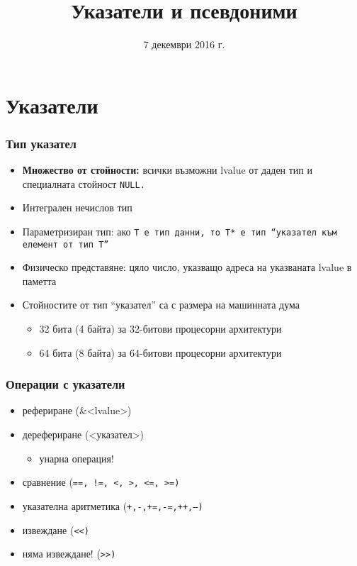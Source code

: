 \documentclass{beamer}
\title{Указатели и псевдоними}
\date{7 декември 2016 г.}
\begin{document}
\begin{frame}
  \titlepage
\end{frame}

\section{Указатели}

\begin{frame}
  \frametitle{Тип указател}
  
  \begin{itemize}
  \item \textbf{Множество от стойности:} всички възможни lvalue от даден тип и специалната стойност \tt{NULL}.
  \item Интегрален \alert{нечислов} тип
  \item Параметризиран тип: ако \tt T е тип данни, то \tt{T*} е тип ``указател към елемент от тип \tt T''
  \item Физическо представяне: цяло число, указващо адреса на указваната lvalue в паметта
  \item Стойностите от тип ``указател'' са с размера на машинната дума
    \begin{itemize}
    \item 32 бита (4 байта) за 32-битови процесорни архитектури
    \item 64 бита (8 байта) за 64-битови процесорни архитектури
    \end{itemize}
  \end{itemize}
\end{frame}

\begin{frame}
  \frametitle{Операции с указатели}

  \begin{itemize}
  \item рефериране (\tta\&<lvalue>)
  \item дерефериране (\tta*<указател>)
    \begin{itemize}
    \item \alert{унарна операция!}
    \end{itemize}
  \item сравнение (\tt{==}, \tt{!=}, \tt<, \tt>, \tt{<=}, \tt{>=})
  \item указателна аритметика (\tt+,\tt-,\tt{+=},\tt{-=},\tt{++},\tt{--})
  \item извеждане (\tt{<{}<})
  \item \alert{няма извеждане! (\tt{>{}>})}
  \end{itemize}
\end{frame}
\end{document}
